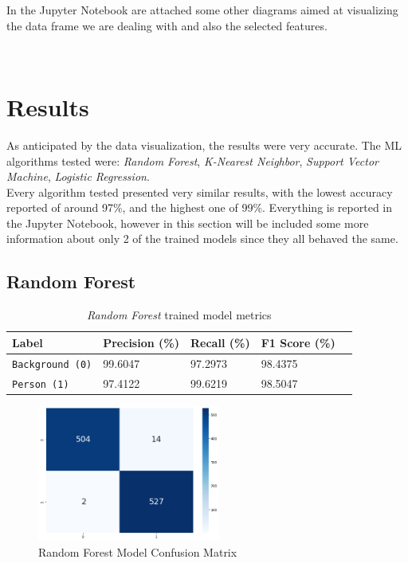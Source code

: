 \documentclass{article}
\begin{document}
In the Jupyter Notebook are attached some other diagrams aimed at visualizing the data frame we are dealing with and also the selected features.

\newpage~\newpage
\section{Results}

As anticipated by the data visualization, the results were very accurate. The ML algorithms tested were: \textit{Random Forest}, \textit{K-Nearest Neighbor}, \textit{Support Vector Machine}, \textit{Logistic Regression}. \\
Every algorithm tested presented very similar results, with the lowest accuracy reported of around 97\%, and the highest one of 99\%. Everything is reported in the Jupyter Notebook, however in this section will be included some more information about only 2 of the trained models since they all behaved the same.

\subsection[]{Random Forest}

\begin{table}[h!]
	\centering
	\begin{tabular}{l|llll}
		\toprule 
		Label & Precision (\%) & Recall (\%) & F1 Score (\%) \\
		\midrule
		\rowcolor{black!10} \texttt{Background (0)} & 99.6047 & 97.2973 & 98.4375 \\
		\texttt{Person (1)} & 97.4122 & 99.6219 & 98.5047 \\
		\bottomrule
	\end{tabular}
	\caption{\textit{Random Forest} trained model metrics}
	\label{tab:rf-results}
 \end{table}

\begin{figure}[h!]
	\centering
	\includegraphics[width=6cm]{assets/rf-confusion-matrix.png}
	\caption{Random Forest Model Confusion Matrix}
	\label{fig::rf-confusion-matrix}
\end{figure}
\end{document}
